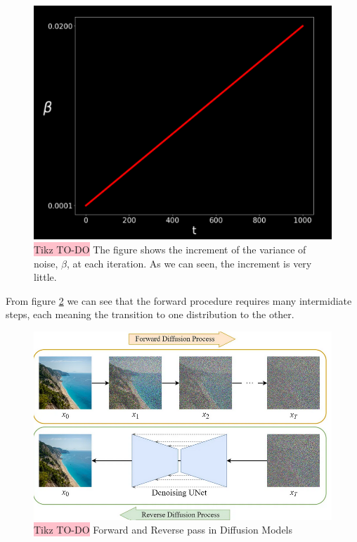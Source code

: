 \begin{figure}[!htbp]
    \centering
    \includegraphics[width=\linewidth]{tikz/Diffusion models noise variance.png}
    \caption{{\color{red}\colorbox{pink}{Tikz TO-DO}} The figure shows the increment of the variance of noise, $\beta$, at each iteration. As we can seen, the increment is very little.}
    \label{fig:noise-variance}
\end{figure}

    
From figure   \ref{fig:diffusion-model} we can see that the forward procedure requires many intermidiate steps, each meaning the transition to one distribution to the other.



\begin{figure}[!htbp]
    \centering
    \includegraphics[width=\linewidth]{tikz/Diffusion Model.png}
    \caption{{\color{red}\colorbox{pink}{Tikz TO-DO}} Forward and Reverse pass in Diffusion Models}
    \label{fig:diffusion-model}
\end{figure}


